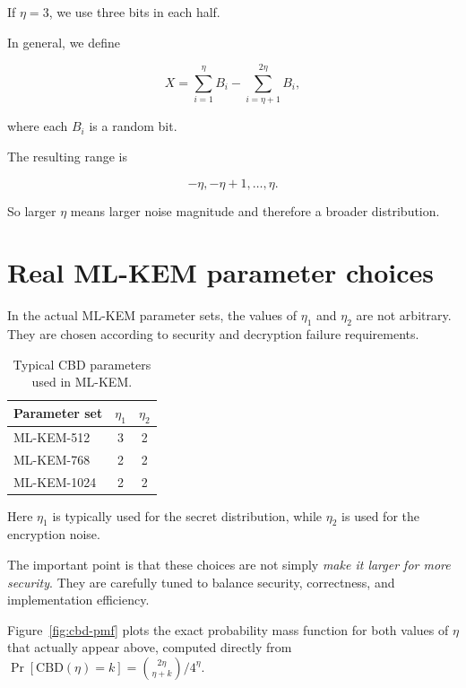 If \(\eta=3\), we use three bits in each half.

In general, we define

\[
X = \sum_{i=1}^{\eta} B_i - \sum_{i=\eta+1}^{2\eta} B_i,
\]

where each \(B_i\) is a random bit.

The resulting range is

\[
-\eta, -\eta+1, \dots, \eta.
\]

So larger \(\eta\) means larger noise magnitude and therefore a broader distribution.

\section{Real ML-KEM parameter choices}

In the actual ML-KEM parameter sets, the values of \(\eta_1\) and \(\eta_2\) are not arbitrary. They are chosen according to security and decryption failure requirements.

\begin{table}[h]
\centering
\begin{tabular}{lcc}
\toprule
Parameter set & \(\eta_1\) & \(\eta_2\) \\
\midrule
ML-KEM-512  & 3 & 2 \\
ML-KEM-768  & 2 & 2 \\
ML-KEM-1024 & 2 & 2 \\
\bottomrule
\end{tabular}
\caption{Typical CBD parameters used in ML-KEM.}
\end{table}

Here \(\eta_1\) is typically used for the secret distribution, while \(\eta_2\) is used for the encryption noise.

The important point is that these choices are not simply \textit{make it larger for more security}. They are carefully tuned to balance security, correctness, and implementation efficiency.

Figure~\ref{fig:cbd-pmf} plots the exact probability mass function for both values of $\eta$ that actually appear above, computed directly from $\Pr[\mathrm{CBD}(\eta)=k]=\binom{2\eta}{\eta+k}/4^{\eta}$.

